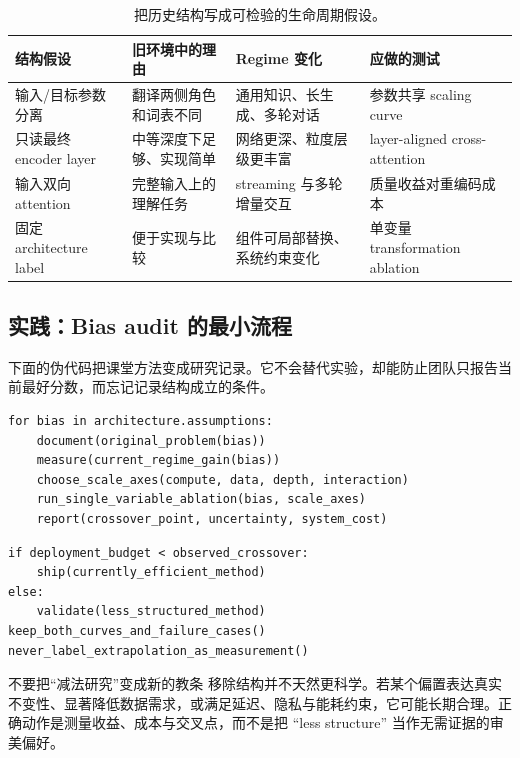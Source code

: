 \begin{table}[H]
\centering
\small
\begin{tabular}{@{}L{0.17\textwidth}L{0.24\textwidth}L{0.24\textwidth}L{0.25\textwidth}@{}}
\toprule
结构假设 & 旧环境中的理由 & Regime 变化 & 应做的测试 \\
\midrule
输入/目标参数分离 & 翻译两侧角色和词表不同 & 通用知识、长生成、多轮对话 & 参数共享 scaling curve \\
只读最终 encoder layer & 中等深度下足够、实现简单 & 网络更深、粒度层级更丰富 & layer-aligned cross-attention \\
输入双向 attention & 完整输入上的理解任务 & streaming 与多轮增量交互 & 质量收益对重编码成本 \\
固定 architecture label & 便于实现与比较 & 组件可局部替换、系统约束变化 & 单变量 transformation ablation \\
\bottomrule
\end{tabular}
\caption{把历史结构写成可检验的生命周期假设。}
\end{table}

\subsection{实践：Bias audit 的最小流程}

下面的伪代码把课堂方法变成研究记录。它不会替代实验，却能防止团队只报告当前最好分数，而忘记记录结构成立的条件。

\begin{lstlisting}[caption={Inductive-bias audit 的研究记录模板}]
for bias in architecture.assumptions:
    document(original_problem(bias))
    measure(current_regime_gain(bias))
    choose_scale_axes(compute, data, depth, interaction)
    run_single_variable_ablation(bias, scale_axes)
    report(crossover_point, uncertainty, system_cost)
\end{lstlisting}

\begin{lstlisting}[caption={区分当前最优与长期趋势的决策伪代码}]
if deployment_budget < observed_crossover:
    ship(currently_efficient_method)
else:
    validate(less_structured_method)
keep_both_curves_and_failure_cases()
never_label_extrapolation_as_measurement()
\end{lstlisting}

\begin{warningbox}{不要把“减法研究”变成新的教条}
移除结构并不天然更科学。若某个偏置表达真实不变性、显著降低数据需求，或满足延迟、隐私与能耗约束，它可能长期合理。正确动作是测量收益、成本与交叉点，而不是把 ``less structure'' 当作无需证据的审美偏好。
\end{warningbox}

